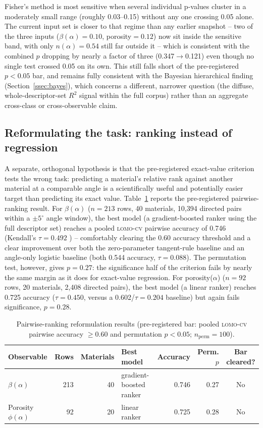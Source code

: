 \documentclass[aip,amsmath,amssymb,reprint]{revtex4-1}
\newcommand{\lomo}{\textsc{lomo-cv}}
\begin{document}
Fisher's method is most sensitive when several individual p-values
cluster in a moderately small range (roughly 0.03--0.15) without any
one crossing 0.05 alone. The current input set is closer to that
regime than any earlier snapshot -- two of the three inputs
($\beta(\alpha)=0.10$, porosity$=0.12$) now sit inside the
sensitive band, with only $n(\alpha)=0.54$ still far outside it --
which is consistent with the combined $p$ dropping by nearly a
factor of three (0.347$\to$0.121) even though no single test crossed
0.05 on its own. This still falls short of the pre-registered
$p<0.05$ bar, and remains fully
consistent with the Bayesian hierarchical finding
(Section~\ref{ssec:bayes}), which concerns a different, narrower
question (the diffuse, whole-descriptor-set $R^2$ signal within the
full corpus) rather than an aggregate cross-class or
cross-observable claim.

\subsection{Reformulating the task: ranking instead of regression}
\label{ssec:ranking}

A separate, orthogonal hypothesis is that the pre-registered
exact-value criterion tests the wrong task: predicting a material's
relative rank against another material at a comparable angle is a
scientifically useful and potentially easier target than predicting
its exact value. Table~\ref{tab:ranking} reports the pre-registered
pairwise-ranking result. For $\beta(\alpha)$ ($n=213$ rows, 40
materials, 10{,}394 directed pairs within a $\pm 5^{\circ}$ angle
window), the best model (a gradient-boosted ranker using the full
descriptor set) reaches a pooled \lomo{} pairwise accuracy of 0.746
(Kendall's $\tau=0.492$ \citep{kendall1938rank}) -- comfortably clearing the 0.60 accuracy
threshold and a clear improvement over both the zero-parameter
tangent-rule baseline and an angle-only logistic baseline (both 0.544
accuracy, $\tau=0.088$). The permutation test, however, gives
$p=0.27$: the significance half of the criterion fails by nearly the
same margin as it does for exact-value regression. For porosity($\alpha$)
($n=92$ rows, 20 materials, 2{,}408 directed pairs), the best model (a
linear ranker) reaches 0.725 accuracy ($\tau=0.450$, versus a
0.602/$\tau=0.204$ baseline) but again fails significance, $p=0.28$.

\begin{table}[htbp]
  \centering
  \caption{Pairwise-ranking reformulation results (pre-registered bar:
    pooled \lomo{} pairwise accuracy $\geq 0.60$ and permutation
    $p<0.05$; $n_{\mathrm{perm}}=100$).}
  \label{tab:ranking}
  \begin{tabular}{lrrlrrc}
    \toprule
    Observable & Rows & Materials & Best model & Accuracy & Perm. $p$ & Bar cleared? \\
    \midrule
    $\beta(\alpha)$         & 213 & 40 & gradient-boosted ranker & 0.746 & 0.27 & No \\
    Porosity $\phi(\alpha)$ & 92  & 20 & linear ranker           & 0.725 & 0.28 & No \\
    \bottomrule
  \end{tabular}
\end{table}
\end{document}
